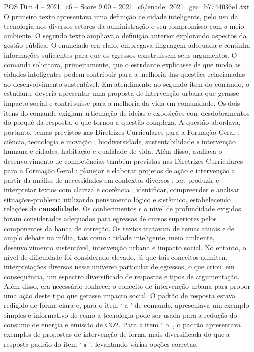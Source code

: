 \begin{textsample}{POS Dim 4 – 2021\_c6 – Score 9.00 – 2021\_c6/enade\_2021\_geo\_b7744036e1.txt}
O primeiro texto apresentava uma definição de cidade inteligente, pelo uso da tecnologia nos diversos setores da administração e seu compromisso com o meio ambiente.
O segundo texto ampliava a definição anterior explorando aspectos da gestão pública.
O enunciado era claro, empregava linguagem adequada e continha informações suficientes para que os egressos construíssem seus argumentos.
O comando solicitava, primeiramente, que o estudante explicasse de que modo as cidades inteligentes podem contribuir para a melhoria das questões relacionadas ao desenvolvimento sustentável.
Em atendimento ao segundo item do comando, o estudante deveria apresentar uma proposta de intervenção urbana que gerasse impacto social e contribuísse para a melhoria da vida em comunidade.
Os dois itens do comando exigiam articulação de ideias e exposições com desdobramentos do porquê da resposta, o que tornou a questão complexa.
A questão abordava, portanto, temas previstos nas Diretrizes Curriculares para a Formação Geral : ciência, tecnologia e inovação ; biodiversidade, sustentabilidade e intervenção humana e cidades, habitação e qualidade de vida.
Além disso, avaliava o desenvolvimento de competências também previstas nas Diretrizes Curriculares para a Formação Geral : planejar e elaborar projetos de ação e intervenção a partir da análise de necessidades em contextos diversos ; ler, produzir e interpretar textos com clareza e coerência ; identificar, compreender e analisar situações-problema utilizando pensamento lógico e sistêmico, estabelecendo relações de \textbf{causalidade}.
Os conhecimentos e o nível de profundidade exigidos foram considerados adequados para egressos de cursos superiores pelos componentes da banca de correção.
Os textos tratavam de temas atuais e de amplo debate na mídia, tais como : cidade inteligente, meio ambiente, desenvolvimento sustentável, intervenção urbana e impacto social.
No entanto, o nível de dificuldade foi considerado elevado, já que tais conceitos admitem interpretações diversas nesse universo particular de egressos, o que criou, em consequência, um espectro diversificado de respostas e tipos de argumentação.
Além disso, era necessário conhecer o conceito de intervenção urbana para propor uma ação deste tipo que gerasse impacto social.
O padrão de resposta estava redigido de forma clara e, para o item ‘ a ’ do comando, apresentava um exemplo simples e informativo de como a tecnologia pode ser usada para a redução do consumo de energia e emissão de CO2.
Para o item ‘ b ’, o padrão apresentava exemplos de propostas de intervenção de forma mais diversificada do que a resposta padrão do item ‘ a ’, levantando várias opções corretas.

\end{textsample}
